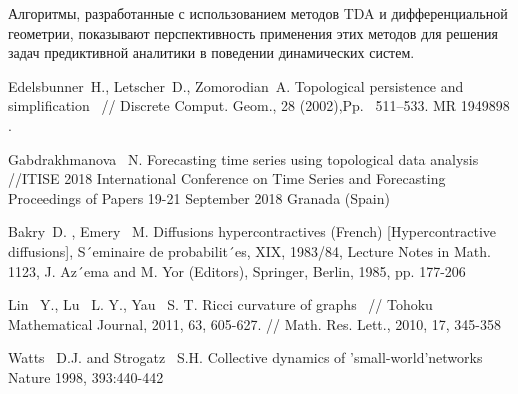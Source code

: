  Алгоритмы, разработанные с использованием методов TDA и дифференциальной геометрии, показывают перспективность применения этих методов для решения задач предиктивной аналитики в поведении динамических систем.






%

\begin{thebibliography}{9} %
 Edelsbunner~H., Letscher~D., Zomorodian~A. Topological persistence and simplification ~// Discrete Comput. Geom., 28 (2002),Pp.~ 511–533. MR 1949898 .


 Gabdrakhmanova~ N.  Forecasting time series using topological data analysis~ //ITISE 2018 International Conference on Time Series and Forecasting Proceedings of Papers 19-21 September 2018 Granada (Spain)

 Bakry~D. , Emery~ M.  Diffusions hypercontractives (French) [Hypercontractive diffusions], S´eminaire de probabilit´es, XIX, 1983/84, Lecture Notes in Math. 1123, J. Az´ema and M. Yor (Editors), Springer, Berlin, 1985, pp. 177-206

 Lin~ Y., Lu~ L. Y., Yau~ S. T. Ricci curvature of graphs ~// Tohoku Mathematical Journal, 2011, 63, 605-627. // Math. Res. Lett., 2010, 17, 345-358

 Watts ~D.J. and Strogatz~ S.H. Collective dynamics of 'small-world'networks Nature 1998, 393:440-442



\end{thebibliography}




%
